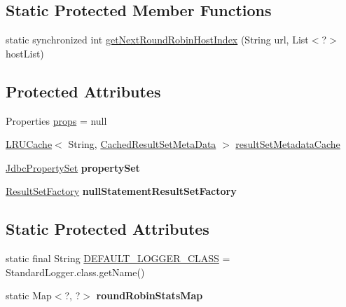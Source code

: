 \subsection*{Static Protected Member Functions}
\begin{DoxyCompactItemize}
\item 
static synchronized int \mbox{\hyperlink{classcom_1_1mysql_1_1cj_1_1jdbc_1_1_connection_impl_afffa26efb98bd5458d9731aa79da4b27}{get\+Next\+Round\+Robin\+Host\+Index}} (String url, List$<$?$>$ host\+List)
\end{DoxyCompactItemize}
\subsection*{Protected Attributes}
\begin{DoxyCompactItemize}
\item 
Properties \mbox{\hyperlink{classcom_1_1mysql_1_1cj_1_1jdbc_1_1_connection_impl_a92220c22abfb2c2541804a7f3306fba0}{props}} = null
\item 
\mbox{\hyperlink{classcom_1_1mysql_1_1cj_1_1util_1_1_l_r_u_cache}{L\+R\+U\+Cache}}$<$ String, \mbox{\hyperlink{interfacecom_1_1mysql_1_1cj_1_1jdbc_1_1result_1_1_cached_result_set_meta_data}{Cached\+Result\+Set\+Meta\+Data}} $>$ \mbox{\hyperlink{classcom_1_1mysql_1_1cj_1_1jdbc_1_1_connection_impl_a270646fc06e81a7f33f830a9b0d04aea}{result\+Set\+Metadata\+Cache}}
\item 
\mbox{\label{classcom_1_1mysql_1_1cj_1_1jdbc_1_1_connection_impl_afe27f2588ac46cc33d47369ea433245a}} 
\mbox{\hyperlink{interfacecom_1_1mysql_1_1cj_1_1jdbc_1_1_jdbc_property_set}{Jdbc\+Property\+Set}} {\bfseries property\+Set}
\item 
\mbox{\label{classcom_1_1mysql_1_1cj_1_1jdbc_1_1_connection_impl_aabe1561ec0dc4066916c76fcefa1db68}} 
\mbox{\hyperlink{classcom_1_1mysql_1_1cj_1_1jdbc_1_1result_1_1_result_set_factory}{Result\+Set\+Factory}} {\bfseries null\+Statement\+Result\+Set\+Factory}
\end{DoxyCompactItemize}
\subsection*{Static Protected Attributes}
\begin{DoxyCompactItemize}
\item 
static final String \mbox{\hyperlink{classcom_1_1mysql_1_1cj_1_1jdbc_1_1_connection_impl_a6ed05323d2d46ab866058d5e8271834f}{D\+E\+F\+A\+U\+L\+T\+\_\+\+L\+O\+G\+G\+E\+R\+\_\+\+C\+L\+A\+SS}} = Standard\+Logger.\+class.\+get\+Name()
\item 
\mbox{\label{classcom_1_1mysql_1_1cj_1_1jdbc_1_1_connection_impl_a44606029fe24ee00001a78959f1e8fca}} 
static Map$<$?, ?$>$ {\bfseries round\+Robin\+Stats\+Map}
\end{DoxyCompactItemize}


